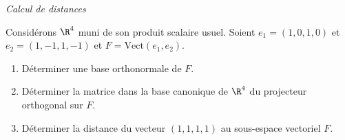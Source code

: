 \documentclass[a4paper,10pt]{report}
\begin{document}
\medskip

\begin{center}
\textit{{ {\large Calcul de distances}}}
\end{center}

\medskip

\begin{Exercice}{} Considérons $\R^4$ muni de son produit scalaire usuel. Soient $e_1=(1,0,1,0)$ et $e_2=(1,-1,1,-1)$ et $F=\textrm{Vect}(e_1,e_2)$.
\begin{enumerate}
    \item  D\'eterminer une base orthonormale de $F.$
    \item  D\'eterminer la matrice dans la base canonique de $\R^4$ du projecteur orthogonal
sur $F.$
    \item  D\'eterminer la distance du vecteur $(1,1,1,1)$ au sous-espace vectoriel  $F.$
\end{enumerate}
\end{Exercice}
\end{document}

